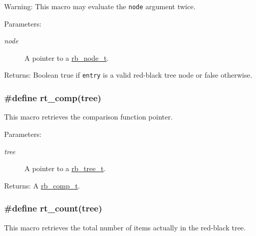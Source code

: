 \begin{Desc}
\item[Warning:]This macro may evaluate the {\tt node} argument twice.\end{Desc}
\begin{Desc}
\item[Parameters:]
\begin{description}
\item[{\em node}]A pointer to a \hyperlink{group__dbprim__rbtree_a1}{rb\_\-node\_\-t}.\end{description}
\end{Desc}
\begin{Desc}
\item[Returns:]Boolean true if {\tt entry} is a valid red-black tree node or false otherwise. \end{Desc}
\hypertarget{group__dbprim__rbtree_a19}{
\subsubsection[rt\_\-comp]{\setlength{\rightskip}{0pt plus 5cm}\#define rt\_\-comp(tree)}}
\label{group__dbprim__rbtree_a19}


This macro retrieves the comparison function pointer.

\begin{Desc}
\item[Parameters:]
\begin{description}
\item[{\em tree}]A pointer to a \hyperlink{group__dbprim__rbtree_a0}{rb\_\-tree\_\-t}.\end{description}
\end{Desc}
\begin{Desc}
\item[Returns:]A \hyperlink{group__dbprim__rbtree_a3}{rb\_\-comp\_\-t}. \end{Desc}
\hypertarget{group__dbprim__rbtree_a17}{
\subsubsection[rt\_\-count]{\setlength{\rightskip}{0pt plus 5cm}\#define rt\_\-count(tree)}}
\label{group__dbprim__rbtree_a17}


This macro retrieves the total number of items actually in the red-black tree.

